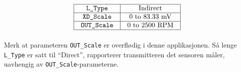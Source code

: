 
$$\vbox{\offinterlineskip
\halign{\strut
\vrule \quad\hfil # \ \hfil & 
\vrule \quad\hfil # \ \hfil \vrule \cr
\noalign{\hrule}
%
{\tt L\_Type} & Indirect \cr
%
\noalign{\hrule}
%
{\tt XD\_Scale} & 0 to 83.33 mV \cr
%
\noalign{\hrule}
%
{\tt OUT\_Scale} & 0 to 2500 RPM \cr
%
\noalign{\hrule}
} %
}$$ %

\vskip 10pt

Merk at parameteren {\tt OUT\_Scale} er overflødig i denne applikasjonen. Så lenge {\tt L\_Type} er satt til ``Direct'', rapporterer transmitteren det sensoren måler, uavhengig av {\tt OUT\_Scale}-parameterne.



